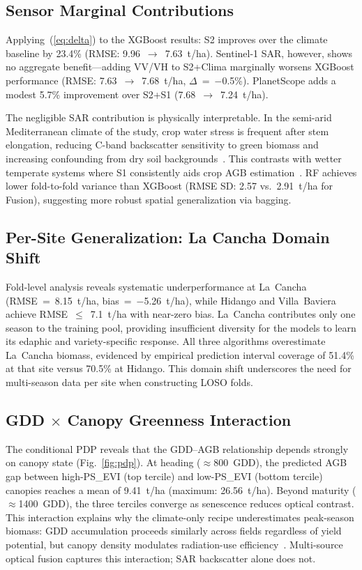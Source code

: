 \documentclass[lettersize,journal]{IEEEtran}
\begin{document}
\subsection{Sensor Marginal Contributions}

Applying~(\ref{eq:delta}) to the XGBoost results: S2 improves over the
climate baseline by 23.4\% (RMSE: 9.96~$\to$~7.63~t/ha). Sentinel-1 SAR,
however, shows no aggregate benefit---adding VV/VH to S2+Clima marginally
worsens XGBoost performance (RMSE: 7.63~$\to$~7.68~t/ha,
$\Delta$~=~$-$0.5\%). PlanetScope adds a modest 5.7\% improvement over
S2+S1 (7.68~$\to$~7.24~t/ha).

The negligible SAR contribution is physically interpretable. In the semi-arid
Mediterranean climate of the study, crop water stress is frequent after stem
elongation, reducing C-band backscatter sensitivity to green biomass and
increasing confounding from dry soil backgrounds~\cite{ref11}. This contrasts
with wetter temperate systems where S1 consistently aids crop AGB
estimation~\cite{ref5,ref6}. RF achieves lower fold-to-fold variance than
XGBoost (RMSE SD: 2.57 vs.\ 2.91~t/ha for Fusion), suggesting more robust
spatial generalization via bagging.

\subsection{Per-Site Generalization: La Cancha Domain Shift}

Fold-level analysis reveals systematic underperformance at La~Cancha
(RMSE~=~8.15~t/ha, bias~=~$-$5.26~t/ha), while Hidango and Villa~Baviera
achieve RMSE~$\leq$~7.1~t/ha with near-zero bias. La~Cancha contributes only
one season to the training pool, providing insufficient diversity for the
models to learn its edaphic and variety-specific response. All three
algorithms overestimate La~Cancha biomass, evidenced by empirical prediction
interval coverage of 51.4\% at that site versus 70.5\% at Hidango. This
domain shift underscores the need for multi-season data per site when
constructing LOSO folds.

\subsection{GDD $\times$ Canopy Greenness Interaction}

The conditional PDP reveals that the GDD--AGB relationship depends strongly
on canopy state (Fig.~\ref{fig:pdp}). At heading ($\approx$800~GDD), the
predicted AGB gap between high-PS\_EVI (top tercile) and low-PS\_EVI (bottom
tercile) canopies reaches a mean of 9.41~t/ha (maximum: 26.56~t/ha). Beyond
maturity ($\approx$1400~GDD), the three terciles converge as senescence
reduces optical contrast. This interaction explains why the climate-only
recipe underestimates peak-season biomass: GDD accumulation proceeds similarly
across fields regardless of yield potential, but canopy density modulates
radiation-use efficiency~\cite{ref16}. Multi-source optical fusion captures
this interaction; SAR backscatter alone does not.
\end{document}
